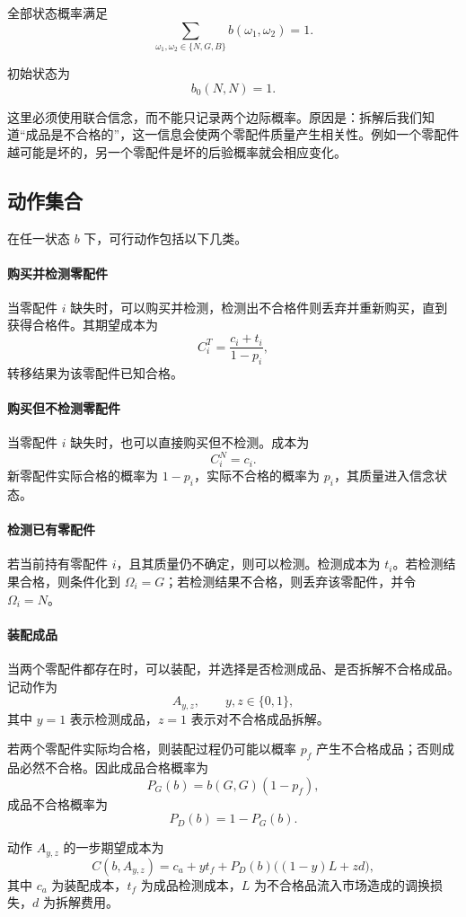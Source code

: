 全部状态概率满足
\[
\sum_{\omega_1,\omega_2\in\{N,G,B\}} b(\omega_1,\omega_2)=1.
\]

初始状态为
\[
b_0(N,N)=1.
\]

这里必须使用联合信念，而不能只记录两个边际概率。原因是：拆解后我们知道“成品是不合格的”，这一信息会使两个零配件质量产生相关性。例如一个零配件越可能是坏的，另一个零配件是坏的后验概率就会相应变化。

\subsection{动作集合}

在任一状态 \(b\) 下，可行动作包括以下几类。

\paragraph{购买并检测零配件}
当零配件 \(i\) 缺失时，可以购买并检测，检测出不合格件则丢弃并重新购买，直到获得合格件。其期望成本为
\[
C_i^{T}=\frac{c_i+t_i}{1-p_i},
\]
转移结果为该零配件已知合格。

\paragraph{购买但不检测零配件}
当零配件 \(i\) 缺失时，也可以直接购买但不检测。成本为
\[
C_i^{N}=c_i.
\]
新零配件实际合格的概率为 \(1-p_i\)，实际不合格的概率为 \(p_i\)，其质量进入信念状态。

\paragraph{检测已有零配件}
若当前持有零配件 \(i\)，且其质量仍不确定，则可以检测。检测成本为 \(t_i\)。若检测结果合格，则条件化到 \(\Omega_i=G\)；若检测结果不合格，则丢弃该零配件，并令 \(\Omega_i=N\)。

\paragraph{装配成品}
当两个零配件都存在时，可以装配，并选择是否检测成品、是否拆解不合格成品。记动作为
\[
A_{y,z},\qquad y,z\in\{0,1\},
\]
其中 \(y=1\) 表示检测成品，\(z=1\) 表示对不合格成品拆解。

若两个零配件实际均合格，则装配过程仍可能以概率 \(p_f\) 产生不合格成品；否则成品必然不合格。因此成品合格概率为
\[
P_G(b)=b(G,G)(1-p_f),
\]
成品不合格概率为
\[
P_D(b)=1-P_G(b).
\]

动作 \(A_{y,z}\) 的一步期望成本为
\[
C(b,A_{y,z})
=
c_a+yt_f+P_D(b)\bigl((1-y)L+zd\bigr),
\]
其中 \(c_a\) 为装配成本，\(t_f\) 为成品检测成本，\(L\) 为不合格品流入市场造成的调换损失，\(d\) 为拆解费用。

